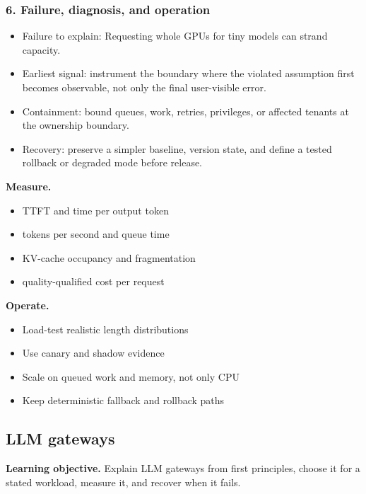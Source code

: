 \subsubsection*{6. Failure, diagnosis, and operation}
\begin{itemize}
\item Failure to explain: Requesting whole GPUs for tiny models can strand capacity.
\item Earliest signal: instrument the boundary where the violated assumption first becomes observable, not only the final user-visible error.
\item Containment: bound queues, work, retries, privileges, or affected tenants at the ownership boundary.
\item Recovery: preserve a simpler baseline, version state, and define a tested rollback or degraded mode before release.
\end{itemize}
\textbf{Measure.}\begin{itemize}
\item TTFT and time per output token
\item tokens per second and queue time
\item KV-cache occupancy and fragmentation
\item quality-qualified cost per request
\end{itemize}
\textbf{Operate.}\begin{itemize}
\item Load-test realistic length distributions
\item Use canary and shadow evidence
\item Scale on queued work and memory, not only CPU
\item Keep deterministic fallback and rollback paths
\end{itemize}
\subsection{LLM gateways}
\textbf{Learning objective.} Explain LLM gateways from first principles, choose it for a stated workload, measure it, and recover when it fails.
